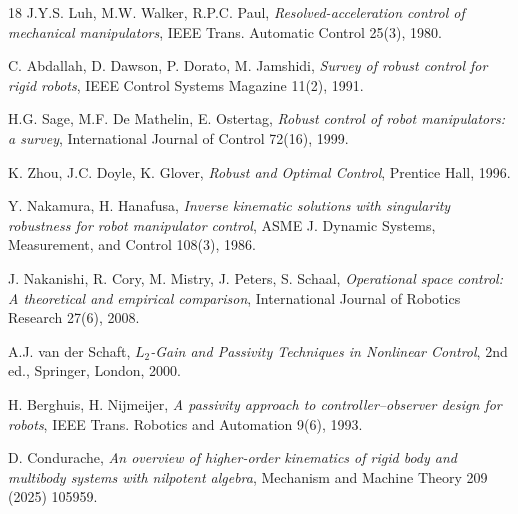 \documentclass[11pt,a4paper]{article}
\begin{document}
\begin{thebibliography}{18}
J.Y.S. Luh, M.W. Walker, R.P.C. Paul, \emph{Resolved-acceleration control of mechanical manipulators},
IEEE Trans. Automatic Control 25(3), 1980.

C. Abdallah, D. Dawson, P. Dorato, M. Jamshidi, \emph{Survey of robust control for rigid robots},
IEEE Control Systems Magazine 11(2), 1991.

H.G. Sage, M.F. De Mathelin, E. Ostertag, \emph{Robust control of robot manipulators: a survey},
International Journal of Control 72(16), 1999.

K. Zhou, J.C. Doyle, K. Glover, \emph{Robust and Optimal Control}, Prentice Hall, 1996.

Y. Nakamura, H. Hanafusa, \emph{Inverse kinematic solutions with singularity robustness for robot manipulator control},
ASME J. Dynamic Systems, Measurement, and Control 108(3), 1986.

J. Nakanishi, R. Cory, M. Mistry, J. Peters, S. Schaal, \emph{Operational space control: A theoretical and empirical comparison},
International Journal of Robotics Research 27(6), 2008.

A.J. van der Schaft, \emph{$L_2$-Gain and Passivity Techniques in Nonlinear Control}, 2nd ed., Springer, London, 2000.

H. Berghuis, H. Nijmeijer, \emph{A passivity approach to controller--observer design for robots},
IEEE Trans. Robotics and Automation 9(6), 1993.

D. Condurache, \emph{An overview of higher-order kinematics of rigid body and multibody systems with nilpotent algebra},
Mechanism and Machine Theory 209 (2025) 105959.

\end{thebibliography}
\end{document}
